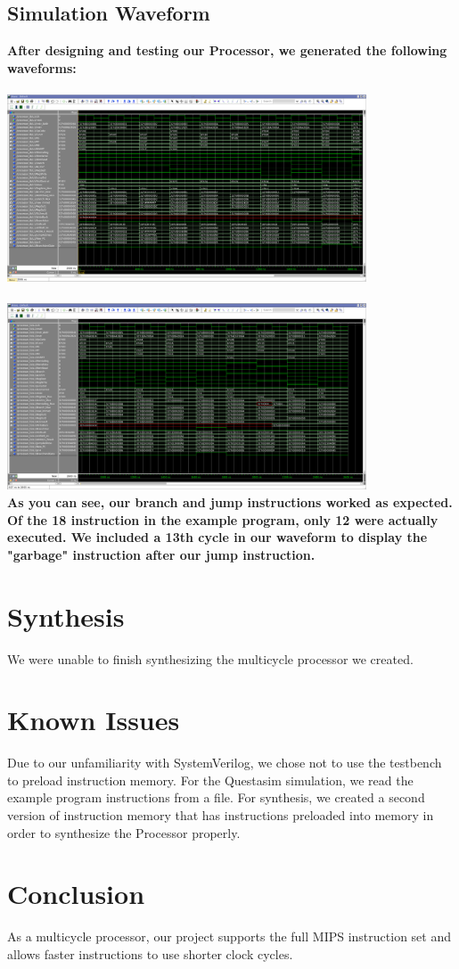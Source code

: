 \documentclass{article}
\begin{document}
\subsection{Simulation Waveform}
\bfseries{After designing and testing our Processor, we generated the following waveforms:} \\ \\
\includegraphics[width=0.8\textwidth]{waveform_part1.png} \\ \\
\includegraphics[width=0.8\textwidth]{waveform_part2.png} \\

As you can see, our branch and jump instructions worked as expected. Of the 18 instruction in the example program, only 12 were actually executed. We included a 13th cycle in our waveform to display the "garbage" instruction after our jump instruction.


\section{Synthesis}
We were unable to finish synthesizing the multicycle processor we created.


\section{Known Issues} 
Due to our unfamiliarity with SystemVerilog, we chose not to use the testbench to preload instruction memory. For the Questasim simulation, we read the example program instructions from a file.  For synthesis, we created a second version of instruction memory that has instructions preloaded into memory in order to synthesize the Processor properly.
\\


\section{Conclusion}
As a multicycle processor, our project supports the full MIPS instruction set and allows faster instructions to use shorter clock cycles.
\end{document}
